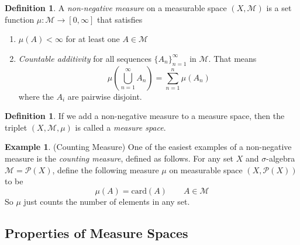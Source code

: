 \documentclass[12pt]{article}
\theoremstyle{plain}
\theoremstyle{definition}
\newtheorem{defn}[thm]{Definition}
\newtheorem{ex}[thm]{Example}
\theoremstyle{remark}
\begin{document}
\begin{defn} 
A \emph{non-negative measure} on a measurable space $(X,\mathscr{M})$ is a set function $\mu: \mathscr{M} \rightarrow [0,\infty]$ that satisfies 
\begin{enumerate}
    \item $\mu(A)<\infty$ for at least one $A\in\mathscr{M}$ 
    \item \emph{Countable additivity} for all sequences $\{A_n\}_{n=1}^\infty$ in $\mathscr{M}$. That means 
        \[
            \mu\left(\bigcup^\infty_{n=1}A_n\right) 
            = \sum^n_{n=1} \mu(A_n)
        \]
        where the $A_i$ are pairwise disjoint.
\end{enumerate}
\end{defn}

\begin{defn} 
If we add a non-negative measure to a measure space, then the triplet $(X,\mathscr{M},\mu)$ is called a \emph{measure space}. 
\end{defn}

\begin{ex}
(Counting Measure) One of the easiest examples of a non-negative measure is the \emph{counting measure}, defined as follows. For any set $X$ and $\sigma$-algebra $\mathscr{M} =\mathscr{P}(X)$, define the following measure $\mu$ on measurable space $(X,\mathscr{P}(X))$ to be 
\[
    \mu(A) = \text{card}(A)  \qquad A\in\mathscr{M}
\]
So $\mu$ just counts the number of elements in any set.
\end{ex}

\subsection{Properties of Measure Spaces}
\label{subsec:propmeas}
\end{document}
